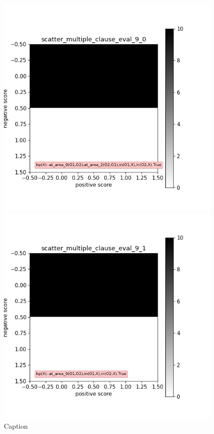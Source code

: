 \documentclass[
]{ceurart}
\begin{document}
\begin{figure}[h]
	\centering
	\begin{minipage}{.3\textwidth}
		\includegraphics[width=\textwidth]{img/mce/mce-0.png}
		\caption{Caption}\label{label-a}
	\end{minipage}
	\begin{minipage}{.3\textwidth}
		\includegraphics[width=\textwidth]{img/mce/mce-1.png}

\end{minipage}
\end{figure}
\end{document}
